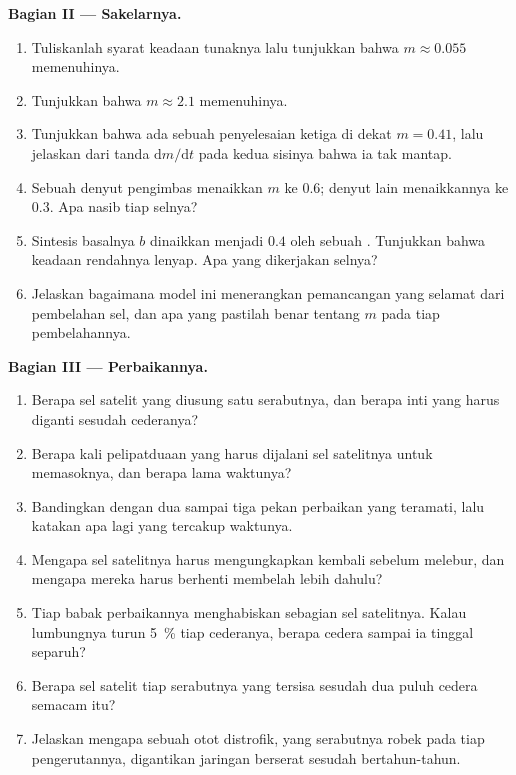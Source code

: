 \begin{problem}
\medskip
\noindent\textbf{Bagian II --- Sakelarnya.}
\begin{enumerate}[resume]
  \item Tuliskanlah syarat keadaan tunaknya lalu tunjukkan bahwa
        $m \approx
        0.055$ memenuhinya.
  \item Tunjukkan bahwa $m \approx 2.1$ memenuhinya.
  \item Tunjukkan bahwa ada sebuah penyelesaian ketiga di dekat
        $m = 0.41$, lalu jelaskan dari tanda
        $\mathrm{d}m/\mathrm{d}t$ pada kedua sisinya bahwa ia tak mantap.
  \item Sebuah denyut pengimbas menaikkan $m$ ke $0.6$; denyut lain
        menaikkannya ke $0.3$. Apa nasib tiap selnya?
  \item Sintesis basalnya $b$ dinaikkan menjadi $0.4$ oleh sebuah
        . Tunjukkan bahwa keadaan rendahnya lenyap. Apa yang
        dikerjakan selnya?
  \item Jelaskan bagaimana model ini menerangkan pemancangan yang
        selamat dari pembelahan sel, dan apa yang pastilah benar
        tentang $m$ pada tiap pembelahannya.
\end{enumerate}

\medskip
\noindent\textbf{Bagian III --- Perbaikannya.}
\begin{enumerate}[resume]
  \item Berapa sel satelit yang diusung satu serabutnya, dan berapa
        inti yang harus diganti sesudah cederanya?
  \item Berapa kali pelipatduaan yang harus dijalani sel satelitnya
        untuk memasoknya, dan berapa lama waktunya?
  \item Bandingkan dengan dua sampai tiga pekan perbaikan yang teramati,
        lalu katakan apa lagi yang tercakup waktunya.
  \item Mengapa sel satelitnya harus mengungkapkan kembali  sebelum
        melebur, dan mengapa mereka harus berhenti membelah lebih dahulu?
  \item Tiap babak perbaikannya menghabiskan sebagian sel satelitnya.
        Kalau lumbungnya turun \qty{5}{\%} tiap cederanya, berapa cedera
        sampai ia tinggal separuh?
  \item Berapa sel satelit tiap serabutnya yang tersisa sesudah dua
        puluh cedera semacam itu?
  \item Jelaskan mengapa sebuah otot distrofik, yang serabutnya robek
        pada tiap pengerutannya, digantikan jaringan berserat sesudah
        bertahun-tahun.
\end{enumerate}


\end{problem}
